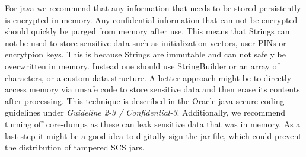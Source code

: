 For java we recommend that any information that needs to be stored persistently is encrypted in memory. Any confidential information that can not be encrypted should quickly be purged from memory after use. This means that Strings can not be used to store sensitive data such as initialization vectors, user PINs or encrytpion keys. This is because Strings are immutable and can not safely be overwritten in memory. Instead one should use StringBuilder or an array of characters, or a custom data structure. A better approach might be to directly access memory via unsafe code to store sensitive data and then erase its contents after processing. This technique is described in the Oracle java secure coding guidelines under \emph{Guideline 2-3 / Confidential-3}. Additionally, we recommend turning off core-dumps as these can leak sensitive data that was in memory. As a last step it might be a good idea to digitally sign the jar file, which could prevent the distribution of tampered SCS jars.